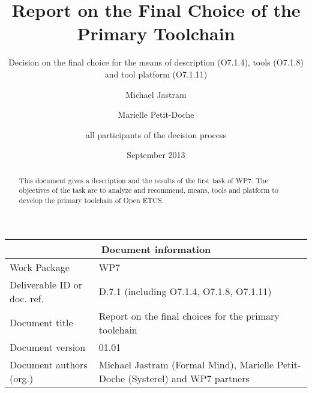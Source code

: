 \documentclass{template/openetcs_report}
\begin{document}
\frontmatter
{}




\title{Report on the Final Choice of the Primary Toolchain }

\subtitle{ Decision on the final choice for the means of description (O7.1.4), tools (O7.1.8) and tool platform (O7.1.11)}

\date{September 2013}


\author{Michael Jastram}

\author{Marielle Petit-Doche}

\author{all participants of the decision process}

 

\begin{abstract}
This document gives  a description and the results of the first task of WP7. The objectives of the task are to analyze and recommend, means, tools and platform to develop the primary toolchain of Open ETCS.

\end{abstract}

\maketitle
\tableofcontents
\listoffiguresandtables
\newpage


\begin{tabular}{|p{4.4cm}|p{8.7cm}|}
\hline
\multicolumn{2}{|c|}{Document information} \\
\hline
Work Package &  WP7  \\
Deliverable ID or doc. ref. & D.7.1 (including O7.1.4, O7.1.8, O7.1.11) \\
\hline
Document title & Report on the final choices for the primary toolchain \\
Document version & 01.01 \\
Document authors (org.)  & Michael Jastram (Formal Mind), Marielle Petit-Doche (Systerel) and WP7 partners  \\
\hline
\end{tabular}
\end{document}
